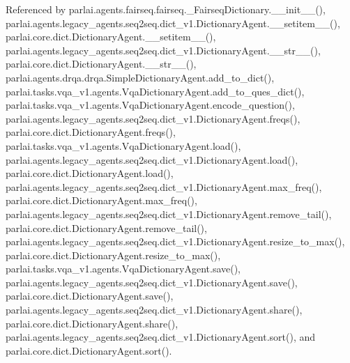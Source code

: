 Referenced by parlai.\+agents.\+fairseq.\+fairseq.\+\_\+\+Fairseq\+Dictionary.\+\_\+\+\_\+init\+\_\+\+\_\+(), parlai.\+agents.\+legacy\+\_\+agents.\+seq2seq.\+dict\+\_\+v1.\+Dictionary\+Agent.\+\_\+\+\_\+setitem\+\_\+\+\_\+(), parlai.\+core.\+dict.\+Dictionary\+Agent.\+\_\+\+\_\+setitem\+\_\+\+\_\+(), parlai.\+agents.\+legacy\+\_\+agents.\+seq2seq.\+dict\+\_\+v1.\+Dictionary\+Agent.\+\_\+\+\_\+str\+\_\+\+\_\+(), parlai.\+core.\+dict.\+Dictionary\+Agent.\+\_\+\+\_\+str\+\_\+\+\_\+(), parlai.\+agents.\+drqa.\+drqa.\+Simple\+Dictionary\+Agent.\+add\+\_\+to\+\_\+dict(), parlai.\+tasks.\+vqa\+\_\+v1.\+agents.\+Vqa\+Dictionary\+Agent.\+add\+\_\+to\+\_\+ques\+\_\+dict(), parlai.\+tasks.\+vqa\+\_\+v1.\+agents.\+Vqa\+Dictionary\+Agent.\+encode\+\_\+question(), parlai.\+agents.\+legacy\+\_\+agents.\+seq2seq.\+dict\+\_\+v1.\+Dictionary\+Agent.\+freqs(), parlai.\+core.\+dict.\+Dictionary\+Agent.\+freqs(), parlai.\+tasks.\+vqa\+\_\+v1.\+agents.\+Vqa\+Dictionary\+Agent.\+load(), parlai.\+agents.\+legacy\+\_\+agents.\+seq2seq.\+dict\+\_\+v1.\+Dictionary\+Agent.\+load(), parlai.\+core.\+dict.\+Dictionary\+Agent.\+load(), parlai.\+agents.\+legacy\+\_\+agents.\+seq2seq.\+dict\+\_\+v1.\+Dictionary\+Agent.\+max\+\_\+freq(), parlai.\+core.\+dict.\+Dictionary\+Agent.\+max\+\_\+freq(), parlai.\+agents.\+legacy\+\_\+agents.\+seq2seq.\+dict\+\_\+v1.\+Dictionary\+Agent.\+remove\+\_\+tail(), parlai.\+core.\+dict.\+Dictionary\+Agent.\+remove\+\_\+tail(), parlai.\+agents.\+legacy\+\_\+agents.\+seq2seq.\+dict\+\_\+v1.\+Dictionary\+Agent.\+resize\+\_\+to\+\_\+max(), parlai.\+core.\+dict.\+Dictionary\+Agent.\+resize\+\_\+to\+\_\+max(), parlai.\+tasks.\+vqa\+\_\+v1.\+agents.\+Vqa\+Dictionary\+Agent.\+save(), parlai.\+agents.\+legacy\+\_\+agents.\+seq2seq.\+dict\+\_\+v1.\+Dictionary\+Agent.\+save(), parlai.\+core.\+dict.\+Dictionary\+Agent.\+save(), parlai.\+agents.\+legacy\+\_\+agents.\+seq2seq.\+dict\+\_\+v1.\+Dictionary\+Agent.\+share(), parlai.\+core.\+dict.\+Dictionary\+Agent.\+share(), parlai.\+agents.\+legacy\+\_\+agents.\+seq2seq.\+dict\+\_\+v1.\+Dictionary\+Agent.\+sort(), and parlai.\+core.\+dict.\+Dictionary\+Agent.\+sort().

\mbox{\label{classparlai_1_1agents_1_1legacy__agents_1_1seq2seq_1_1dict__v1_1_1DictionaryAgent_a1f9e03173a4c05693aef97c5cec4d3db}} 
